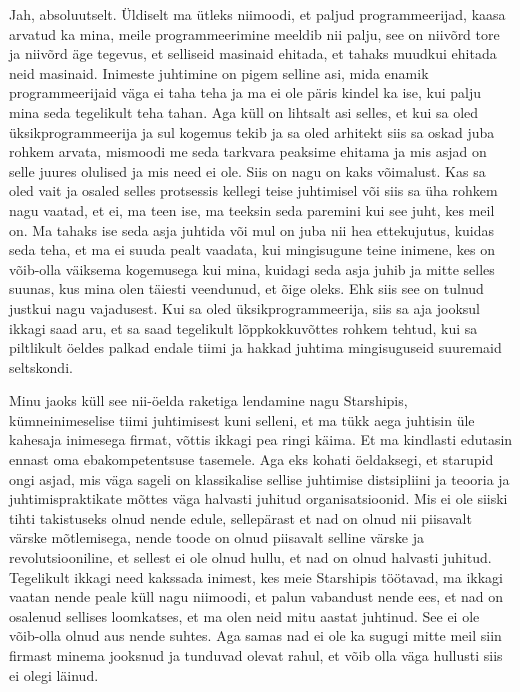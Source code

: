 
Jah, absoluutselt.  Üldiselt ma ütleks niimoodi, et paljud programmeerijad, 
kaasa arvatud ka mina, meile programmeerimine meeldib nii palju, see on niivõrd 
tore  ja niivõrd äge tegevus, et selliseid masinaid ehitada, et tahaks  
muudkui ehitada neid masinaid. Inimeste juhtimine on pigem selline asi, mida 
enamik programmeerijaid väga ei taha teha ja ma ei ole päris kindel ka ise, kui 
palju mina seda tegelikult teha tahan. Aga küll on lihtsalt asi selles, et kui 
sa oled  üksikprogrammeerija ja sul kogemus tekib ja sa oled  arhitekt siis sa 
oskad juba rohkem  arvata, mismoodi me seda tarkvara peaksime ehitama ja mis 
asjad on selle juures olulised ja mis need ei ole. Siis on nagu on kaks võimalust. 
Kas sa  oled vait ja osaled selles protsessis  kellegi teise juhtimisel või siis 
sa üha rohkem nagu vaatad, et ei, ma teen ise, ma teeksin seda paremini 
kui see juht, kes meil on. Ma tahaks ise seda asja juhtida või mul on juba nii 
hea ettekujutus, kuidas seda teha, et ma ei suuda pealt vaadata, kui 
mingisugune teine inimene, kes on võib-olla väiksema kogemusega kui mina,  
kuidagi seda asja juhib ja mitte selles suunas, kus mina olen täiesti 
veendunud, et  õige oleks. Ehk siis see on tulnud justkui nagu vajadusest. Kui 
sa oled üksikprogrammeerija, siis sa aja jooksul ikkagi saad aru, et sa saad 
tegelikult lõppkokkuvõttes rohkem tehtud, kui sa piltlikult öeldes palkad 
endale tiimi ja hakkad juhtima mingisuguseid suuremaid seltskondi. 

Minu jaoks küll see nii-öelda raketiga lendamine nagu Starshipis, kümneinimeselise 
tiimi juhtimisest kuni selleni, et ma tükk aega juhtisin üle kahesaja inimesega firmat, võttis ikkagi pea ringi käima. Et ma kindlasti 
edutasin ennast  oma ebakompetentsuse tasemele. Aga eks kohati öeldaksegi, et 
starupid ongi asjad, mis  väga sageli on  klassikalise sellise juhtimise 
distsipliini ja teooria ja juhtimispraktikate mõttes väga halvasti juhitud 
organisatsioonid. Mis ei ole siiski tihti takistuseks olnud nende edule, 
sellepärast et nad on olnud nii piisavalt värske mõtlemisega, nende toode on 
olnud piisavalt selline värske ja revolutsiooniline, et sellest ei ole olnud 
hullu, et nad on olnud halvasti juhitud. Tegelikult ikkagi need kakssada 
inimest, kes meie Starshipis töötavad,  ma ikkagi vaatan nende peale küll nagu 
niimoodi, et palun vabandust nende ees, et nad on osalenud sellises loomkatses, 
et ma olen neid mitu aastat juhtinud. See ei ole võib-olla olnud aus nende 
suhtes. Aga samas nad ei ole ka sugugi mitte meil siin firmast minema jooksnud 
ja tunduvad olevat rahul, et võib olla väga hullusti siis ei olegi läinud.
